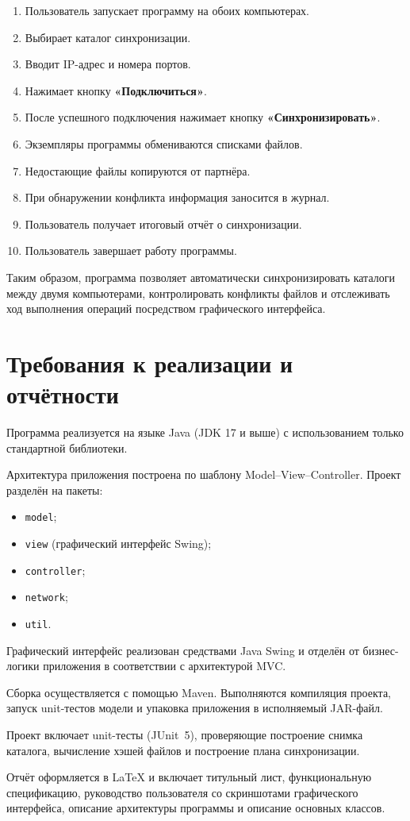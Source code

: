 \documentclass[12pt,a4paper]{article}
\begin{document}
\begin{enumerate}[nosep]
    \item Пользователь запускает программу на обоих компьютерах.
    \item Выбирает каталог синхронизации.
    \item Вводит IP-адрес и номера портов.
    \item Нажимает кнопку \textbf{«Подключиться»}.
    \item После успешного подключения нажимает кнопку \textbf{«Синхронизировать»}.
    \item Экземпляры программы обмениваются списками файлов.
    \item Недостающие файлы копируются от партнёра.
    \item При обнаружении конфликта информация заносится в журнал.
    \item Пользователь получает итоговый отчёт о синхронизации.
    \item Пользователь завершает работу программы.
\end{enumerate}

Таким образом, программа позволяет автоматически синхронизировать каталоги между двумя компьютерами, контролировать конфликты файлов и отслеживать ход выполнения операций посредством графического интерфейса.

\section{Требования к реализации и отчётности}

Программа реализуется на языке Java (JDK 17 и выше) с использованием только стандартной библиотеки.

Архитектура приложения построена по шаблону Model--View--Controller. Проект разделён на пакеты:

\begin{itemize}[nosep]
    \item \texttt{model};
    \item \texttt{view} (графический интерфейс Swing);
    \item \texttt{controller};
    \item \texttt{network};
    \item \texttt{util}.
\end{itemize}

Графический интерфейс реализован средствами Java Swing и отделён от бизнес-логики приложения в соответствии с архитектурой MVC.

Сборка осуществляется с помощью Maven. Выполняются компиляция проекта, запуск unit-тестов модели и упаковка приложения в исполняемый JAR-файл.

Проект включает unit-тесты (JUnit~5), проверяющие построение снимка каталога, вычисление хэшей файлов и построение плана синхронизации.

Отчёт оформляется в \LaTeX{} и включает титульный лист, функциональную спецификацию, руководство пользователя со скриншотами графического интерфейса, описание архитектуры программы и описание основных классов.
\end{document}
